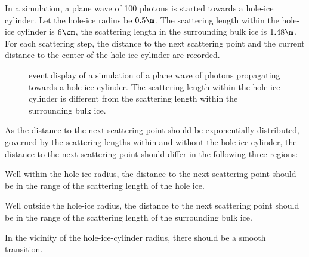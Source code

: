 In a simulation, a plane wave of 100 photons is started towards a hole-ice cylinder. Let the hole-ice radius be $0.5\m$. The scattering length within the hole-ice cylinder is $6\cm$, the scattering length in the surrounding bulk ice is $1.48\m$.
For each scattering step, the distance to the next scattering point and the current distance to the center of the hole-ice cylinder are recorded.


\begin{figure}[htbp]
  \caption{\steamshovel event display of a simulation of a plane wave of photons propagating towards a hole-ice cylinder. The scattering length within the hole-ice cylinder is different from the scattering length within the surrounding bulk ice.}
  \label{fig:An7ik8pu}
\end{figure}

As the distance to the next scattering point should be exponentially distributed, governed by the scattering lengths within and without the hole-ice cylinder, the distance to the next scattering point should differ in the following three regions:

Well within the hole-ice radius, the distance to the next scattering point should be in the range of the scattering length of the hole ice.

Well outside the hole-ice radius, the distance to the next scattering point should be in the range of the scattering length of the surrounding bulk ice.

In the vicinity of the hole-ice-cylinder radius, there should be a smooth transition. 

